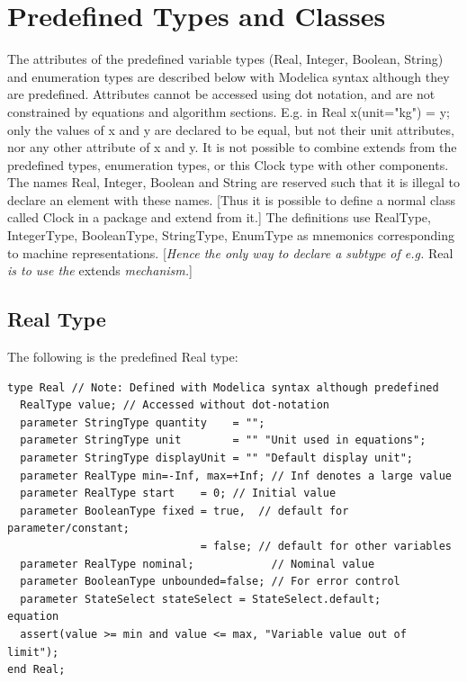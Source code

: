 \documentclass[10pt,a4paper]{report}
\def\doublelabel#1{\label{#1}}
\begin{document}
\section{Predefined Types and Classes}\doublelabel{predefined-types-and-classes}

The attributes of the predefined variable types (Real, Integer, Boolean,
String) and enumeration types are described below with Modelica syntax
although they are predefined. Attributes cannot be accessed using dot
notation, and are not constrained by equations and algorithm sections.
E.g. in Real x(unit="kg") = y; only the values of x and y are declared
to be equal, but not their unit attributes, nor any other attribute of x
and y. It is not possible to combine extends from the predefined types,
enumeration types, or this Clock type with other components. The names
Real, Integer, Boolean and String are reserved such that it is illegal
to declare an element with these names. {[}Thus it is possible to define
a normal class called Clock in a package and extend from it.{]} The
definitions use RealType, IntegerType, BooleanType, StringType, EnumType
as mnemonics corresponding to machine representations. {[}\emph{Hence
the only way to declare a subtype of e.g.} Real \emph{is to use the}
extends \emph{mechanism.}{]}

\subsection{Real Type}\doublelabel{real-type}

The following is the predefined Real type:

\begin{lstlisting}[language=modelica]
type Real // Note: Defined with Modelica syntax although predefined
  RealType value; // Accessed without dot-notation
  parameter StringType quantity    = "";
  parameter StringType unit        = "" "Unit used in equations";
  parameter StringType displayUnit = "" "Default display unit";
  parameter RealType min=-Inf, max=+Inf; // Inf denotes a large value
  parameter RealType start    = 0; // Initial value
  parameter BooleanType fixed = true,  // default for parameter/constant;
                              = false; // default for other variables
  parameter RealType nominal;            // Nominal value
  parameter BooleanType unbounded=false; // For error control
  parameter StateSelect stateSelect = StateSelect.default;
equation
  assert(value >= min and value <= max, "Variable value out of limit");
end Real;
\end{lstlisting}
\end{document}
